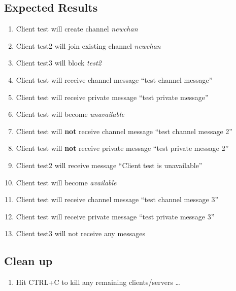 \documentclass[12pt]{article}
\begin{document}
\subsection*{Expected Results}
\begin{enumerate}
\item Client test will create channel \emph{newchan}
\item Client test2 will join existing channel \emph{newchan}
\item Client test3 will block \emph{test2}
\item Client test will receive channel message ``test channel message''
\item Client test will receive private message ``test private message''
\item Client test will become \emph{unavailable}
\item Client test will \textbf{not} receive channel message ``test channel message 2''
\item Client test will \textbf{not} receive private message ``test private message 2''
\item Client test2 will receive message ``Client test is unavailable''
\item Client test will become \emph{available}
\item Client test will receive channel message ``test channel message 3''
\item Client test will receive private message ``test private message 3''
\item Client test3 will not receive any messages
\end{enumerate}

\subsection*{Clean up}
\begin{enumerate}
\item Hit CTRL+C to kill any remaining clients/servers \dots
\end{enumerate}
\end{document}
